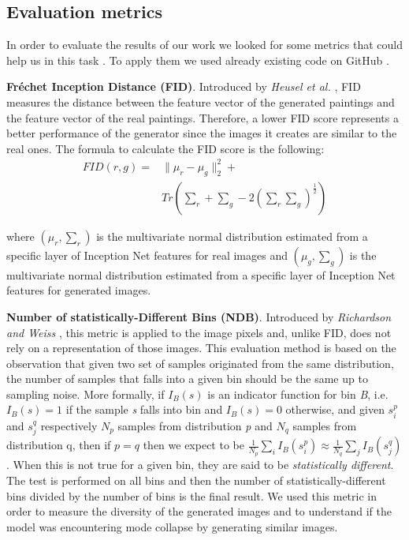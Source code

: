 \documentclass[10pt,twocolumn,letterpaper]{article}
\begin{document}
\subsection{Evaluation metrics}
In order to evaluate the results of our work we looked for some metrics that could help us in this task \cite{metrics}. To apply them we used already existing code on GitHub \cite{metricsRepo}.

\textbf{Fréchet Inception Distance (FID)}. Introduced by \textit{Heusel et al.} \cite{fid}, FID measures the distance between the feature vector of the generated paintings and the feature vector of the real paintings. Therefore, a lower FID score represents a better performance of the generator since the images it creates are similar to the real ones. The formula to calculate the FID score is the following:
\begin{equation}
	\begin{split}
		\textstyle FID(r, g) = & \| \mu_{r} - \mu_{g} \| _{2}^{2} + \\ 
			& \textstyle Tr(\sum_{r} +  \sum_{g} - 2(\sum_{r}\sum_{g})^\frac{1}{2})
	\end{split}
\end{equation}
 
where $\textstyle (\mu_{r} , \sum_{r})$ is the multivariate normal distribution estimated from a specific layer of Inception Net features for real images and $\textstyle (\mu_{g} , \sum_{g})$ is the multivariate normal distribution estimated from a specific layer of Inception Net features for generated images. 

\textbf{Number of statistically-Different Bins (NDB)}. Introduced by \textit{Richardson and Weiss} \cite{ndb}, this metric is applied to the image pixels and, unlike FID, does not rely on a representation of those images. This evaluation method is based on the observation that given two set of samples originated from the same distribution, the number of samples that falls into a given bin should be the same up to sampling noise. More formally, if $I_{B}(s)$ is an indicator function for bin \textit{B}, i.e. $I_{B}(s)=1$ if the sample \textit{s} falls into bin  and $I_{B}(s)=0$ otherwise, and given ${s_{i}^{p}}$ and ${s_{j}^{q}}$ respectively ${N_{p}}$ samples from distribution \textit{p} and ${N_{q}}$ samples from distribution q, then if $p=q$ then we expect to be $\textstyle \frac{1}{N_p}\sum_{i}{I_B(s_{i}^{p})} \approx \frac{1}{N_q}\sum_{j}{I_B(s_{j}^{q})} $. When this is not true for a given bin, they are said to be \textit{statistically different}. The test is performed on all bins and then the number of statistically-different bins divided by the number of bins is the final result. We used this metric in order to measure the diversity of the generated images and to understand if the model was encountering mode collapse by generating similar images. 
\end{document}
